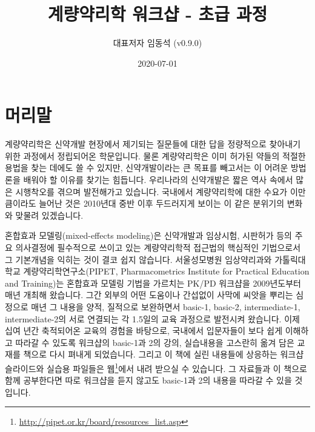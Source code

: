 \documentclass[
  10pt,
  krantz2,
  a4paper]{krantz}
\title{계량약리학 워크샵 - 초급 과정}
\author{대표저자 임동석 (v0.9.0)}
\date{2020-07-01}
\theoremstyle{definition}
\theoremstyle{definition}
\theoremstyle{definition}
\theoremstyle{remark}
\begin{document}
\maketitle

\thispagestyle{empty}
\begin{center}
\end{center}

\setlength{\abovedisplayskip}{-5pt}
\setlength{\abovedisplayshortskip}{-5pt}

{
\hypersetup{linkcolor=}
\setcounter{tocdepth}{2}
\tableofcontents
}
\listoftables
\listoffigures
{}
\hypertarget{uxba38uxb9acuxb9d0}{%
\chapter*{머리말}\label{uxba38uxb9acuxb9d0}}


계량약리학은 신약개발 현장에서 제기되는 질문들에 대한 답을 정량적으로 찾아내기 위한 과정에서 정립되어온 학문입니다. 물론 계량약리학은 이미 허가된 약들의 적절한 용법을 찾는 데에도 쓸 수 있지만, 신약개발이라는 큰 목표를 빼고서는 이 어려운 방법론을 배워야 할 이유를 찾기는 힘듭니다. 우리나라의 신약개발은 짧은 역사 속에서 많은 시행착오를 겪으며 발전해가고 있습니다. 국내에서 계량약리학에 대한 수요가 이만큼이라도 늘어난 것은 2010년대 중반 이후 두드러지게 보이는 이 같은 분위기의 변화와 맞물려 있겠습니다.

혼합효과 모델링(mixed-effects modeling)은 신약개발과 임상시험, 시판허가 등의 주요 의사결정에 필수적으로 쓰이고 있는 계량약리학적 접근법의 핵심적인 기법으로서 그 기본개념을 익히는 것이 결코 쉽지 않습니다. 서울성모병원 임상약리과와 가톨릭대학교 계량약리학연구소(PIPET, Pharmacometrics Institute for Practical Education and Training)는 혼합효과 모델링 기법을 가르치는 PK/PD 워크샵을 2009년도부터 매년 개최해 왔습니다. 그간 외부의 어떤 도움이나 간섭없이 사막에 씨앗을 뿌리는 심정으로 매년 그 내용을 양적, 질적으로 보완하면서 basic-1, basic-2, intermediate-1, intermediate-2의 서로 연결되는 각 1.5일의 교육 과정으로 발전시켜 왔습니다. 이제 십여 년간 축적되어온 교육의 경험을 바탕으로, 국내에서 입문자들이 보다 쉽게 이해하고 따라갈 수 있도록 워크샵의 basic-1과 2의 강의, 실습내용을 고스란히 옮겨 담은 교재를 책으로 다시 펴내게 되었습니다. 그리고 이 책에 실린 내용들에 상응하는 워크샵 슬라이드와 실습용 파일들은 웹\footnote{\url{http://pipet.or.kr/board/resources_list.asp}}에서 내려 받으실 수 있습니다. 그 자료들과 이 책으로 함께 공부한다면 따로 워크샵을 듣지 않고도 basic-1과 2의 내용을 따라갈 수 있을 것입니다.
\end{document}
